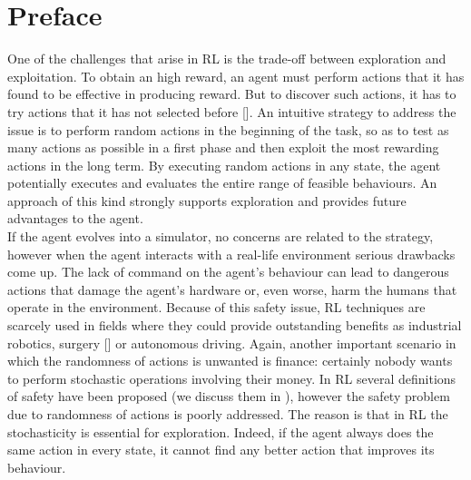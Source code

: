 

\chapter*{Preface}
One of the challenges that arise in \acf{RL} is the trade-off between exploration and exploitation. To obtain an high reward, an agent must perform actions that it has found to be effective in producing reward. But to discover such actions, it has to try actions that it has not selected before [\cite{sutton2018reinforcement}]. An intuitive strategy to address the issue is to perform random actions in the beginning of the task, so as to test as many actions as possible in a first phase and then exploit the most rewarding actions in the long term. By executing random actions in any state, the agent potentially executes and evaluates the entire range of feasible behaviours. An approach of this kind strongly supports exploration and provides future advantages to the agent.\\
\newline
If the agent evolves into a simulator, no concerns are related to the strategy, however when the agent interacts with a real-life environment serious drawbacks come up. The lack of command on the agent's behaviour can lead to dangerous actions that damage the agent's hardware or, even worse, harm the humans that operate in the environment. Because of this safety issue, \ac{RL} techniques are scarcely used in fields where they could provide outstanding benefits as industrial robotics, surgery [\cite{baek2018PathPlanning}] or autonomous driving. Again, another important scenario in which the randomness of actions is unwanted is finance: certainly nobody wants to perform stochastic operations involving their money. In \ac{RL} several definitions of safety have been proposed (we discuss them in ), however the safety problem due to randomness of actions is poorly addressed. The reason is that in \ac{RL} the stochasticity is essential for exploration. Indeed, if the agent always does the same action in every state, it cannot find any better action that improves its behaviour.\\
\newline
